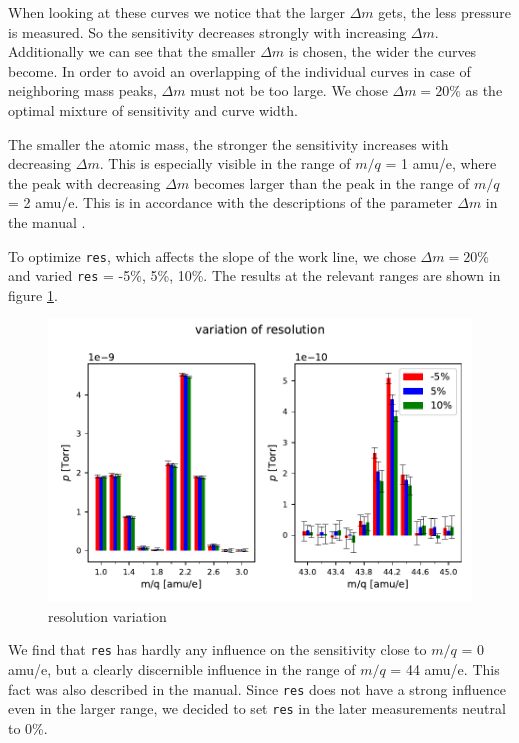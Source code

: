     When looking at these curves we notice that the larger $\Delta m$ gets, the less pressure is measured. So the sensitivity decreases strongly with increasing $\Delta m$. Additionally we can see
    that the smaller $\Delta m$ is chosen, the wider the curves become. In order to avoid an overlapping of the individual curves in case of neighboring mass peaks, $\Delta m$ must not be too large. We chose $\Delta m= 20\%$ as the optimal mixture of sensitivity and curve width. 
    
    The smaller the atomic mass, the stronger the sensitivity increases with decreasing $\Delta m$. This is especially visible in the range of $m/q$ = 1 amu/e, where the peak with decreasing $\Delta m$ becomes larger than the peak in the range of $m/q$ = 2 amu/e. This is in accordance with the descriptions of the parameter $\Delta m$ in the manual \cite{manual}. 
    
    To optimize \texttt{res}, which affects the slope of the work line, we chose $\Delta m = 20\%$ and varied \texttt{res} = -5\%, 5\%, 10\%. The results at the relevant ranges are shown in figure \ref{fig:resolution_variation}.
    
    \begin{figure}[h!]
        \centering
        \includegraphics[width=1 \textwidth]{Report/DataResultsPlots/resolution_variation_h2_and_co2.pdf}
        \caption{resolution variation}
        \label{fig:resolution_variation}
    \end{figure}
    
    We find that \texttt{res} has hardly any influence on the sensitivity close to $m/q$ = 0 amu/e, but a clearly discernible influence in the range of $m/q$ = 44 amu/e. This fact was also described in the manual. Since \texttt{res} does not have a strong influence even in the larger range, we decided to set \texttt{res} in the later measurements neutral to 0\%. 
    
